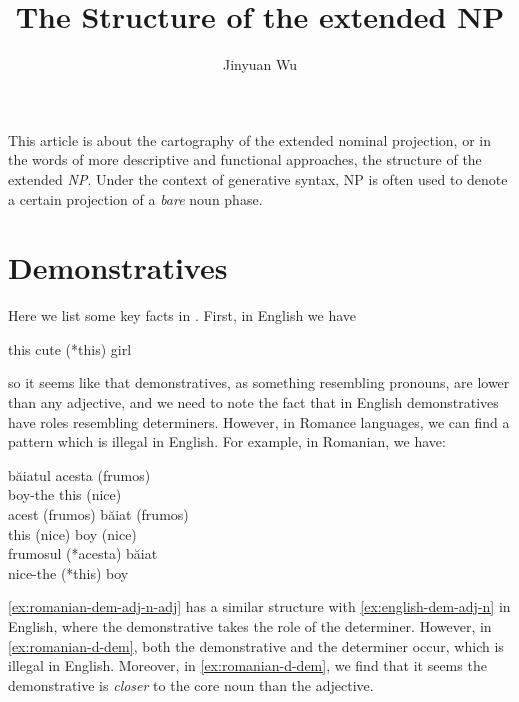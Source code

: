 \documentclass[a4paper]{article}
\title{The Structure of the extended NP}
\author{Jinyuan Wu}
\begin{document}
\maketitle

This article is about the cartography of the extended nominal projection, or in the words of more descriptive and 
functional approaches, the structure of the extended \emph{NP}. Under the context of generative syntax, NP is often 
used to denote a certain projection of a \emph{bare} noun phase. 

\section{Demonstratives}

Here we list some key facts in \cite{bruge2002positions}. First, in English we have 
\begin{exe}
    \ex\label{ex:english-dem-adj-n} this cute (*this) girl  
\end{exe}
so it seems like that demonstratives, as something resembling pronouns, are lower than any adjective,
and we need to note the fact that in English demonstratives have roles resembling determiners. However, in 
Romance languages, we can find a pattern which is illegal in English. For example, in Romanian, 
we have:
\begin{exe}
    \ex 
    \begin{xlist}
        \ex \label{ex:romanian-d-dem}
        \gll băiatul acesta (frumos) \\  
        boy-the this (nice) \\
        \ex \label{ex:romanian-dem-adj-n-adj}
        \gll acest (frumos) băiat (frumos) \\
        this (nice) boy (nice) \\
        \ex 
        \gll frumosul (*acesta) băiat \\
        nice-the (*this) boy \\ 
    \end{xlist}
\end{exe}
\eqref{ex:romanian-dem-adj-n-adj} has a similar structure with \eqref{ex:english-dem-adj-n} in English,
where the demonstrative takes the role of the determiner. However, in \eqref{ex:romanian-d-dem}, both 
the demonstrative and the determiner occur, which is illegal in English. Moreover, in \eqref{ex:romanian-d-dem},
we find that it seems the demonstrative is \emph{closer} to the core noun than the adjective. 





\end{document}
